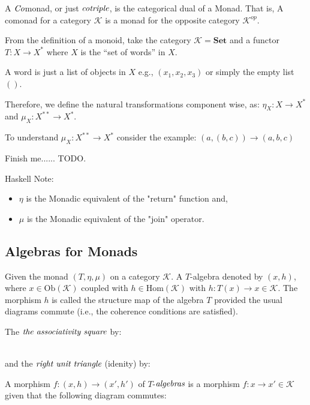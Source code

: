 \documentclass[10pt, oneside, reqno]{amsart}
\begin{document}
\begin{rem}[Comonad]
 A $\emph{Co}$monad, or just $\emph{cotriple}$, is the categorical dual of a Monad.
 That is, A comonad for a category $\mathcal{K}$ is a monad for the opposite category $\mathcal{K}^{op}$.
\end{rem}


\begin{exmp}
 From the definition of a monoid,
 take the category $\mathcal{K} = \textbf{Set}$ and a functor $T: X \to X^{*}$ where $X$ is the ``set of words'' in $X$.
 \begin{rem}
  A word is just a list of objects in $X$ e.g., $(x_{1}, x_{2}, x_{3})$ or simply the empty list $()$.
 \end{rem}
 Therefore, we define the natural transformations component wise, as: $\eta_{X}: X \to X^{*}$ and $\mu_{X}: X^{**} \to X^{*}$.
 \begin{rem}
  To understand $\mu_{X}: X^{**} \to X^{*}$ consider the example: $(a, (b, c)) \to (a, b, c)$
 \end{rem}
 Finish me...... TODO.
\end{exmp}

\begin{note}
Haskell Note:
\begin{itemize}
 \item $\eta$ is the Monadic equivalent of the "return" function and,
 \item $\mu$ is the Monadic equivalent of the "join" operator.
\end{itemize}
\end{note}


\subsection{Algebras for Monads} %
\label{sec:monadalgebra}
Given the monad $(T, \eta, \mu)$ on a category $\mathcal{K}$. A $T$-algebra denoted by $(x,h)$,
where $x \in \text{Ob}(\mathcal{K})$ coupled with $h \in \text{Hom}(\mathcal{K})$ with
$h: T(x) \to x \in \mathcal{K}$. The morphism $h$ is called the structure map of the algebra $T$ provided
the usual diagrams commute (i.e., the coherence conditions are satisfied).

The $\emph{the associativity square}$ by:
\\
and the $\emph{right unit triangle}$ (idenity) by:

A morphism $f: (x,h) \to (x',h')$ of $T$-$\emph{algebras}$ is a morphism $f: x \to x' \in \mathcal{K}$
given that the following diagram commutes:
\end{document}
